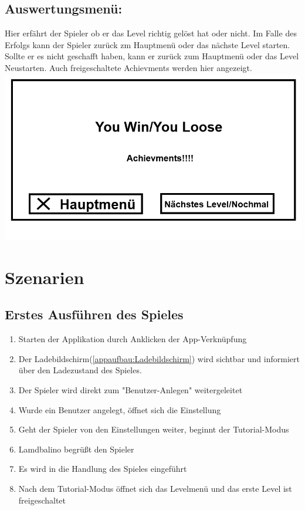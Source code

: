 \documentclass{scrartcl}
\begin{document}
\begin{enumerate}
	\begin{minipage}{1\textwidth}
		\item \subsection*{Auswertungsmenü:}
		Hier erfährt der Spieler ob er das Level richtig gelöst hat oder nicht.
		Im Falle des Erfolgs kann der Spieler zurück zm Hauptmenü oder das nächste Level starten.
		Sollte er es nicht geschafft haben, kann er zurück zum Hauptmenü oder das Level Neustarten. Auch freigeschaltete Achievments werden hier angezeigt.\\
		\includegraphics[width=\textwidth, height=7.5cm]{assets/Auswertungsmenu}
	\end{minipage}

\end{enumerate}

\clearpage

\section{Szenarien}

\subsection{Erstes Ausführen des Spieles}
	\begin{enumerate}
		\item Starten der Applikation durch Anklicken der App-Verknüpfung
		\item Der Ladebildschirm(\ref{appaufbau:Ladebildschirm}) wird sichtbar und informiert über den Ladezustand des Spieles.
		\item Der Spieler wird direkt zum "Benutzer-Anlegen"  weitergeleitet
		\item Wurde ein Benutzer angelegt, öffnet sich die Einstellung
		\item Geht der Spieler von den Einstellungen weiter, beginnt der Tutorial-Modus
		\item Lamdbalino begrüßt den Spieler
		\item Es wird in die Handlung des Spieles eingeführt
		\item Nach dem Tutorial-Modus öffnet sich das Levelmenü und das erste Level ist freigeschaltet 
	\end{enumerate}
	
\end{document}
